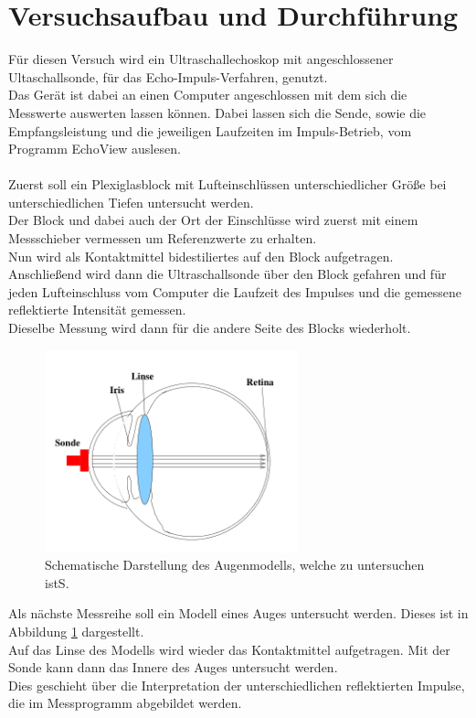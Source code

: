 
\section{Versuchsaufbau und Durchführung}

\noindent
Für diesen Versuch wird ein Ultraschallechoskop mit angeschlossener Ultaschallsonde, für das Echo-Impuls-Verfahren, genutzt.\\
Das Gerät ist dabei an einen Computer angeschlossen mit dem sich die Messwerte auswerten lassen können.
Dabei lassen sich die Sende, sowie die Empfangsleistung und die jeweiligen Laufzeiten im Impuls-Betrieb, vom Programm EchoView auslesen.\\\\

\noindent
Zuerst soll ein Plexiglasblock mit Lufteinschlüssen unterschiedlicher Größe bei unterschiedlichen Tiefen untersucht werden.\\
Der Block und dabei auch der Ort der Einschlüsse wird zuerst mit einem Messschieber vermessen um Referenzwerte zu erhalten.\\
Nun wird als Kontaktmittel bidestiliertes auf den Block aufgetragen. 
Anschließend wird dann die Ultraschallsonde über den Block gefahren und für jeden Lufteinschluss vom Computer die Laufzeit des Impulses und die gemessene reflektierte Intensität gemessen.\\
Dieselbe Messung wird dann für die andere Seite des Blocks wiederholt.

\begin{figure}
    \centering
    \includegraphics[width=0.65\textwidth]{latex/images/auge.PNG}
    \caption{Schematische Darstellung des Augenmodells, welche zu untersuchen istS\protect \cite{US1}.}
    \label{img:auge}
\end{figure}

\noindent
Als nächste Messreihe soll ein Modell eines Auges untersucht werden. Dieses ist in Abbildung \ref{img:auge} dargestellt.\\
Auf das Linse des Modells wird wieder das Kontaktmittel aufgetragen. Mit der Sonde kann dann das Innere des Auges untersucht werden.\\
Dies geschieht über die Interpretation der unterschiedlichen reflektierten Impulse, die im Messprogramm abgebildet werden.


